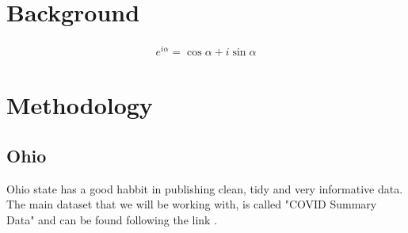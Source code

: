 \documentclass[conference]{IEEEtran}
\begin{document}
\section{Background}

\blindtext 

\begin{eqnarray}
  \label{eq:1}
  e^{i\alpha} = \cos\alpha + i \sin\alpha
\end{eqnarray}

\blindtext 

\blindtext 

\section{Methodology}

\subsection{Ohio}
\label{Ohio}

Ohio state has a good habbit in publishing clean, tidy and very informative data. The main dataset that we will be working with, is called "COVID Summary Data" and can be found following the link \cite{system_covid-19_nodate}.
\end{document}

